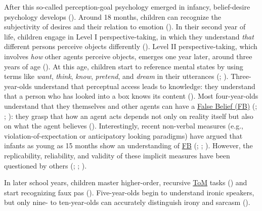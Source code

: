 \documentclass[
]{scrbook}
\begin{document}
After this so-called perception-goal psychology emerged in infancy, belief-desire psychology develops (). Around 18 months, children can recognize the subjectivity of desires and their relation to emotion (). In their second year of life, children engage in Level I perspective-taking, in which they understand \emph{that} different persons perceive objects differently (). Level II perspective-taking, which involves \emph{how} other agents perceive objects, emerges one year later, around three years of age (). At this age, children start to reference mental states by using terms like \emph{want}, \emph{think}, \emph{know}, \emph{pretend}, and \emph{dream} in their utterances (; ). Three-year-olds understand that perceptual access leads to knowledge: they understand that a person who has looked into a box knows its content (). Most four-year-olds understand that they themselves and other agents can have a \hyperref[acronyms_FB]{False Belief (FB)} (; ; ): they grasp that how an agent acts depends not only on reality itself but also on what the agent believes (). Interestingly, recent non-verbal measures (e.g., violation-of-expectation or anticipatory looking paradigms) have argued that infants as young as 15 months show an understanding of \hyperref[acronyms_FB]{FB} (; ; ). However, the replicability, reliability, and validity of these implicit measures have been questioned by others (; ; ).

In later school years, children master higher-order, recursive \hyperref[acronyms_ToM]{ToM} tasks () and start recognizing faux pas (). Five-year-olds begin to understand ironic speakers, but only nine- to ten-year-olds can accurately distinguish irony and sarcasm ().
\end{document}
